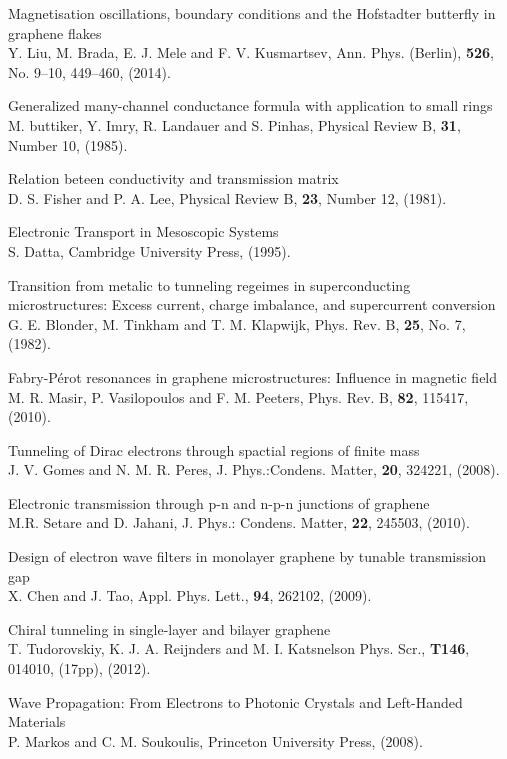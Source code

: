 \documentclass[12pt,a4paper]{report}
\begin{document}
\begin{thebibliography}{10}
Magnetisation oscillations, boundary conditions and the Hofstadter butterfly in graphene flakes\\
Y. Liu, M. Brada, E. J. Mele and F. V. Kusmartsev,
Ann. Phys. (Berlin), {\bf 526}, No. 9–10, 449–460, (2014).

 Generalized many-channel conductance formula with application to small rings\\
M. buttiker, Y. Imry, R. Landauer and S. Pinhas,
Physical Review B, {\bf 31}, Number 10, (1985).

 Relation beteen conductivity and transmission matrix\\
D. S. Fisher and P. A. Lee,
Physical Review B, {\bf 23}, Number 12, (1981).

 Electronic Transport in Mesoscopic Systems\\ 
S. Datta,
Cambridge University Press, (1995).

 Transition from metalic to tunneling regeimes in superconducting microstructures: Excess current, charge imbalance, and supercurrent conversion\\
G. E. Blonder, M. Tinkham and T. M. Klapwijk,
Phys. Rev. B, {\bf 25}, No. 7, (1982).

 Fabry-P\'{e}rot resonances in graphene microstructures: Influence in magnetic field\\
M. R. Masir, P. Vasilopoulos and F. M. Peeters,
Phys. Rev. B, {\bf 82}, 115417, (2010).

 Tunneling of Dirac electrons through spactial regions of finite mass\\
J. V. Gomes and N. M. R. Peres,
J. Phys.:Condens. Matter, {\bf 20}, 324221, (2008).

 Electronic transmission through p-n and n-p-n junctions of graphene\\
M.R. Setare and D. Jahani,
J. Phys.: Condens. Matter, {\bf 22}, 245503, (2010).

 Design of electron wave filters in monolayer graphene by tunable transmission gap\\
X. Chen and J. Tao,
Appl. Phys. Lett., {\bf 94}, 262102, (2009).

Chiral tunneling in single-layer and bilayer graphene\\
T. Tudorovskiy, K. J. A. Reijnders and M. I. Katsnelson
Phys. Scr., {\bf T146}, 014010, (17pp), (2012).

 Wave Propagation: From Electrons to Photonic Crystals and Left-Handed Materials\\
P. Markos and C. M. Soukoulis,
Princeton University Press, (2008).


\end{thebibliography}
\end{document}
